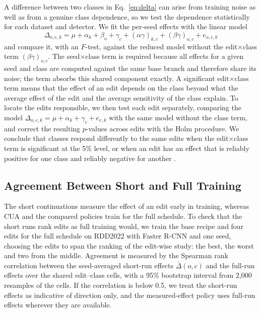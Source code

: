 A difference between two classes in Eq.~\eqref{eq:delta} can arise from training noise as well as from a genuine class dependence, so we test the dependence statistically for each dataset and detector. We fit the per-seed effects with the linear model
\begin{equation}
\Delta_{o,c,k}=\mu+\alpha_k+\beta_o+\gamma_c+(\alpha\gamma)_{k,c}+(\beta\gamma)_{o,c}+e_{o,c,k}
\label{eq:anova}
\end{equation}
and compare it, with an $F$-test, against the reduced model without the edit$\times$class term $(\beta\gamma)_{o,c}$. The seed$\times$class term is required because all effects for a given seed and class are computed against the same base branch and therefore share its noise; the term absorbs this shared component exactly. A significant edit$\times$class term means that the effect of an edit depends on the class beyond what the average effect of the edit and the average sensitivity of the class explain. To locate the edits responsible, we then test each edit separately, comparing the model $\Delta_{o,c,k}=\mu+\alpha_k+\gamma_c+e_{c,k}$ with the same model without the class term, and correct the resulting $p$-values across edits with the Holm procedure. We conclude that classes respond differently to the same edits when the edit$\times$class term is significant at the 5\% level, or when an edit has an effect that is reliably positive for one class and reliably negative for another .

\subsection{Agreement Between Short and Full Training}
\label{sec:measure_proxy}

The short continuations measure the effect of an edit early in training, whereas CUA and the compared policies train for the full schedule. To check that the short runs rank edits as full training would, we train the base recipe and four edits for the full schedule on RDD2022 with Faster R-CNN and one seed, choosing the edits to span the ranking of the edit-wise study: the best, the worst and two from the middle. Agreement is measured by the Spearman rank correlation between the seed-averaged short-run effects $\bar\Delta(o,c)$ and the full-run effects over the shared edit--class cells, with a 95\% bootstrap interval from 2,000 resamples of the cells. If the correlation is below 0.5, we treat the short-run effects as indicative of direction only, and the measured-effect policy uses full-run effects wherever they are available.


